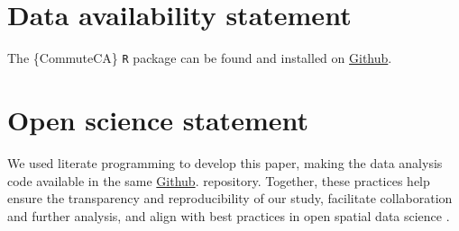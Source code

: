 \documentclass[sn-basic,lineno,pdflatex]{sn-jnl}
\begin{document}
\section*{Data availability
statement}\label{data-availability-statement}

The \{CommuteCA\} \texttt{R} package can be found and installed on
\href{https://github.com/dias-bruno/CommuteCA}{Github}.

\section*{Open science statement}\label{open-science-statement}

We used literate programming to develop this paper, making the data
analysis code available in the same
\href{https://github.com/dias-bruno/CommuteCA}{Github}. repository.
Together, these practices help ensure the transparency and
reproducibility of our study, facilitate collaboration and further
analysis, and align with best practices in open spatial data science
\citep{paez_open_2021, arribas-bel2021}.

\renewcommand\refname{References}

\end{document}
